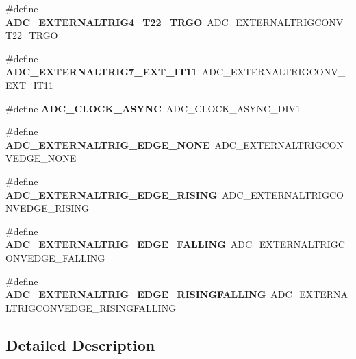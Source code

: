 \begin{DoxyCompactItemize}
\item 
\#define {\bfseries A\+D\+C\+\_\+\+E\+X\+T\+E\+R\+N\+A\+L\+T\+R\+I\+G4\+\_\+\+T22\+\_\+\+T\+R\+GO}~A\+D\+C\+\_\+\+E\+X\+T\+E\+R\+N\+A\+L\+T\+R\+I\+G\+C\+O\+N\+V\+\_\+\+T22\+\_\+\+T\+R\+GO\hypertarget{group___h_a_l___a_d_c___aliased___defines_ga671cb20b99d24f3c9923ac7777e5f84e}{}\label{group___h_a_l___a_d_c___aliased___defines_ga671cb20b99d24f3c9923ac7777e5f84e}

\item 
\#define {\bfseries A\+D\+C\+\_\+\+E\+X\+T\+E\+R\+N\+A\+L\+T\+R\+I\+G7\+\_\+\+E\+X\+T\+\_\+\+I\+T11}~A\+D\+C\+\_\+\+E\+X\+T\+E\+R\+N\+A\+L\+T\+R\+I\+G\+C\+O\+N\+V\+\_\+\+E\+X\+T\+\_\+\+I\+T11\hypertarget{group___h_a_l___a_d_c___aliased___defines_ga54407c5dc446f7d5425d8ac135bee69e}{}\label{group___h_a_l___a_d_c___aliased___defines_ga54407c5dc446f7d5425d8ac135bee69e}

\item 
\#define {\bfseries A\+D\+C\+\_\+\+C\+L\+O\+C\+K\+\_\+\+A\+S\+Y\+NC}~A\+D\+C\+\_\+\+C\+L\+O\+C\+K\+\_\+\+A\+S\+Y\+N\+C\+\_\+\+D\+I\+V1\hypertarget{group___h_a_l___a_d_c___aliased___defines_gae507056750621dbc26572874e89ef791}{}\label{group___h_a_l___a_d_c___aliased___defines_gae507056750621dbc26572874e89ef791}

\item 
\#define {\bfseries A\+D\+C\+\_\+\+E\+X\+T\+E\+R\+N\+A\+L\+T\+R\+I\+G\+\_\+\+E\+D\+G\+E\+\_\+\+N\+O\+NE}~A\+D\+C\+\_\+\+E\+X\+T\+E\+R\+N\+A\+L\+T\+R\+I\+G\+C\+O\+N\+V\+E\+D\+G\+E\+\_\+\+N\+O\+NE\hypertarget{group___h_a_l___a_d_c___aliased___defines_ga324129b8c65e1f89b0002c31297935eb}{}\label{group___h_a_l___a_d_c___aliased___defines_ga324129b8c65e1f89b0002c31297935eb}

\item 
\#define {\bfseries A\+D\+C\+\_\+\+E\+X\+T\+E\+R\+N\+A\+L\+T\+R\+I\+G\+\_\+\+E\+D\+G\+E\+\_\+\+R\+I\+S\+I\+NG}~A\+D\+C\+\_\+\+E\+X\+T\+E\+R\+N\+A\+L\+T\+R\+I\+G\+C\+O\+N\+V\+E\+D\+G\+E\+\_\+\+R\+I\+S\+I\+NG\hypertarget{group___h_a_l___a_d_c___aliased___defines_ga7955225cafbadae21be3c9eaaab4bd58}{}\label{group___h_a_l___a_d_c___aliased___defines_ga7955225cafbadae21be3c9eaaab4bd58}

\item 
\#define {\bfseries A\+D\+C\+\_\+\+E\+X\+T\+E\+R\+N\+A\+L\+T\+R\+I\+G\+\_\+\+E\+D\+G\+E\+\_\+\+F\+A\+L\+L\+I\+NG}~A\+D\+C\+\_\+\+E\+X\+T\+E\+R\+N\+A\+L\+T\+R\+I\+G\+C\+O\+N\+V\+E\+D\+G\+E\+\_\+\+F\+A\+L\+L\+I\+NG\hypertarget{group___h_a_l___a_d_c___aliased___defines_ga0b539c9290d819da8932016f4a4ca2a1}{}\label{group___h_a_l___a_d_c___aliased___defines_ga0b539c9290d819da8932016f4a4ca2a1}

\item 
\#define {\bfseries A\+D\+C\+\_\+\+E\+X\+T\+E\+R\+N\+A\+L\+T\+R\+I\+G\+\_\+\+E\+D\+G\+E\+\_\+\+R\+I\+S\+I\+N\+G\+F\+A\+L\+L\+I\+NG}~A\+D\+C\+\_\+\+E\+X\+T\+E\+R\+N\+A\+L\+T\+R\+I\+G\+C\+O\+N\+V\+E\+D\+G\+E\+\_\+\+R\+I\+S\+I\+N\+G\+F\+A\+L\+L\+I\+NG\hypertarget{group___h_a_l___a_d_c___aliased___defines_gaa0c1b4c780d8091fd60f2624ceb2f3a4}{}\label{group___h_a_l___a_d_c___aliased___defines_gaa0c1b4c780d8091fd60f2624ceb2f3a4}

\end{DoxyCompactItemize}


\subsection{Detailed Description}
